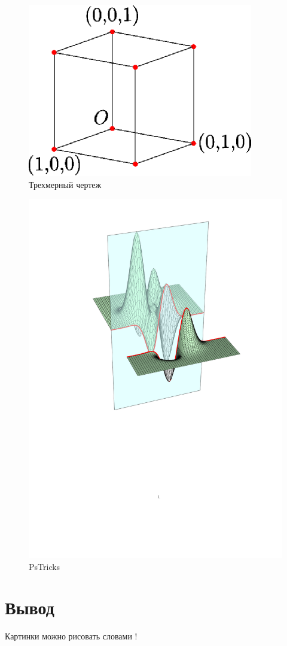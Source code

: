 \begin{figure}[h]
    \includegraphics{myscript}
    \centering
    \caption{Трехмерный чертеж}
\end{figure}

\begin{figure}[h]
    \includegraphics{script5.pdf}
    \centering
    \caption{PsTricks}
\end{figure}

\chapter{Вывод}

Картинки можно рисовать словами\cite{mpost} \cite{mpost_2}!



